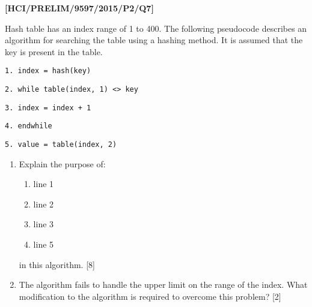 \item \textbf{{[}HCI/PRELIM/9597/2015/P2/Q7{]} }

Hash table has an index range of 1 to 400. The following pseudocode
describes an algorithm for searching the table using a hashing method.
It is assumed that the key is present in the table. 

\noindent\begin{minipage}[t]{1\columnwidth}%
\texttt{1. index = hash(key)}

\texttt{2. while table(index, 1) <> key }

\texttt{3. \qquad{}index = index + 1}

\texttt{4. endwhile }

\texttt{5. value = table(index, 2) }%
\end{minipage}
\begin{enumerate}
\item Explain the purpose of: 
\begin{enumerate}
\item line 1 
\item line 2 
\item line 3 
\item line 5 
\end{enumerate}
in this algorithm. \hfill{} {[}8{]}
\item The algorithm fails to handle the upper limit on the range of the
index. What modification to the algorithm is required to overcome
this problem? \hfill{} {[}2{]}
\end{enumerate}